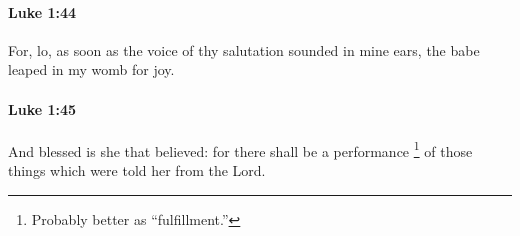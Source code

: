 		\paragraph{Luke 1:44} %
			\label{LUKE-1-44}

			For, lo, as soon as the voice of thy salutation sounded in mine ears, the babe leaped in my womb for joy.

			\begin{framed}
			\scriptsize
				\begin{compactdesc}
					\item[SBLG] 
				\end{compactdesc}
			\end{framed}

		\paragraph{Luke 1:45} %
			\label{LUKE-1-45}

			And blessed is she that believed: for there shall be a performance%
				\footnote{%
					Probably better as ``fulfillment.''
					}
			of those things which were told her from the Lord.

